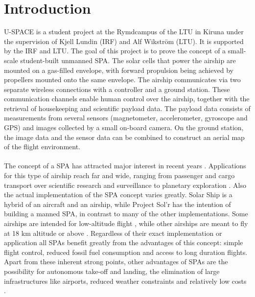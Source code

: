 \newpage
\chapter{Introduction}
\label{chap:introduction}

\ac{U-SPACE} is a student project at the Rymdcampus of the \ac{LTU} in Kiruna under the supervision of Kjell Lundin (\ac{IRF}) and Alf Wikström (\ac{LTU}). It is supported by the \ac{IRF} and \ac{LTU}. The goal of this project is to prove the concept of a small-scale student-built unmanned \ac{SPA}. The solar cells that power the airship are mounted on a gas-filled envelope, with forward propulsion being achieved by propellers mounted onto the same envelope. The airship communicates via two separate wireless connections with a controller and a ground station. These communication channels enable human control over the airship, together with the retrieval of housekeeping and scientific payload data. The payload data consists of measurements from several sensors (magnetometer, accelerometer, gyroscope and \ac{GPS}) and images collected by a small on-board camera. On the ground station, the image data and the sensor data can be combined to construct an aerial map of the flight environment.
\\
\\
The concept of a \ac{SPA} has attracted major interest in recent years \cite{website:ravenaerostar, website:gaya, poster:saba, report:colozza2004, website:solr, website:ISIS, website:helios, website:solarship}. Applications for this type of airship reach far and wide, ranging from passenger and cargo transport \cite{website:gaya, website:solr, website:helios, website:solarship} over scientific research \cite{poster:saba} and surveillance \cite{website:ravenaerostar, website:ISIS, website:helios} to planetary exploration \cite{report:colozza2004}. Also the actual implementation of the \ac{SPA} concept varies greatly. Solar Ship \cite{website:solarship} is a hybrid of an aircraft and an airship, while Project Sol'r \cite{website:solr} has the intention of building a manned \ac{SPA}, in contrast to many of the other implementations. Some airships are intended for low-altitude flight \cite{website:solr, website:helios}, while other airships are meant to fly at 18 km altitude or above \cite{website:ravenaerostar, poster:saba, website:ISIS}. Regardless of their exact implementation or application all \ac{SPA}s benefit greatly from the advantages of this concept: simple flight control, reduced fossil fuel consumption and access to long duration flights. Apart from these inherent strong points, other advantages of \ac{SPA}s are the possibility for autonomous take-off and landing, the elimination of large infrastructures like airports, reduced weather constraints and relatively low costs \cite{website:ravenaerostar, website:gaya}.
